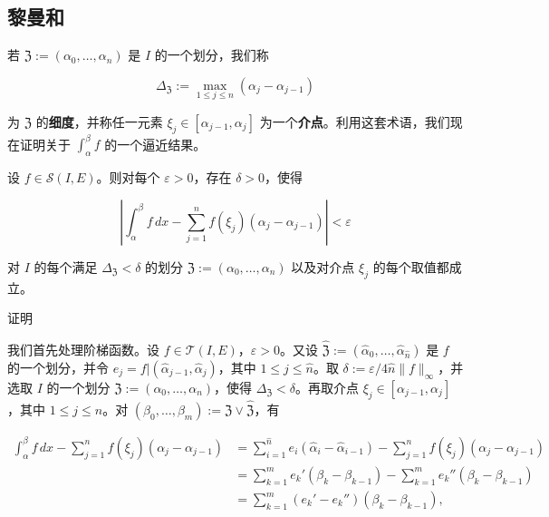 \subsection*{黎曼和}

若 $ \mathfrak{Z} := (\alpha_0, \ldots, \alpha_n) $ 是 $ I $ 的一个划分，我们称

\[
\Delta_{\mathfrak{Z}} := \max_{1 \le j \le n} (\alpha_j - \alpha_{j-1})
\]

为 $ \mathfrak{Z} $ 的\textbf{细度}，并称任一元素 $ \xi_j \in [\alpha_{j-1}, \alpha_j] $ 为一个\textbf{介点}。利用这套术语，我们现在证明关于 $ \int_{\alpha}^{\beta} f $ 的一个逼近结果。

\begin{theorem}

设 $ f \in \mathcal{S}(I, E) $。则对每个 $ \varepsilon > 0 $，存在 $ \delta > 0 $，使得

\[
\left| \int_{\alpha}^{\beta} f \, dx - \sum_{j=1}^{n} f(\xi_j)(\alpha_j - \alpha_{j-1}) \right| < \varepsilon
\]

对 $ I $ 的每个满足 $ \Delta_{\mathfrak{Z}} < \delta $ 的划分 $ \mathfrak{Z} := (\alpha_0, \ldots, \alpha_n) $ 以及对介点 $ \xi_j $ 的每个取值都成立。

证明

\begin{subitems}
\item

我们首先处理阶梯函数。设 $ f \in \mathcal{T}(I, E) $，$ \varepsilon > 0 $。又设 $ \widehat{\mathfrak{Z}} := (\widehat{\alpha}_0, \ldots, \widehat{\alpha}_{\hat{n}}) $ 是 $ f $ 的一个划分，并令 $ e_j = f|(\widehat{\alpha}_{j-1}, \widehat{\alpha}_j) $，其中 $ 1 \le j \le \hat{n} $。取 $ \delta := \varepsilon/4\hat{n}\|f\|_{\infty} $，并选取 $ I $ 的一个划分 $ \mathfrak{Z} := (\alpha_0, \ldots, \alpha_n) $，使得 $ \Delta_{\mathfrak{Z}} < \delta $。再取介点 $ \xi_j \in [\alpha_{j-1}, \alpha_j] $，其中 $ 1 \le j \le n $。对 $ (\beta_0, \ldots, \beta_m) := \mathfrak{Z} \vee \widehat{\mathfrak{Z}} $，有

\begin{equation}
\begin{aligned}
\int_{\alpha}^{\beta} f \, dx - \sum_{j=1}^{n} f(\xi_j)(\alpha_j - \alpha_{j-1}) &= \sum_{i=1}^{\hat{n}} e_i(\widehat{\alpha}_i - \widehat{\alpha}_{i-1}) - \sum_{j=1}^{n} f(\xi_j)(\alpha_j - \alpha_{j-1}) \\ &= \sum_{k=1}^{m} e_k'(\beta_k - \beta_{k-1}) - \sum_{k=1}^{m} e_k''(\beta_k - \beta_{k-1}) \\ &= \sum_{k=1}^{m} (e_k' - e_k'')(\beta_k - \beta_{k-1}) ,
\end{aligned}\tag{3.1}
\end{equation}


\end{subitems}
\end{theorem}
